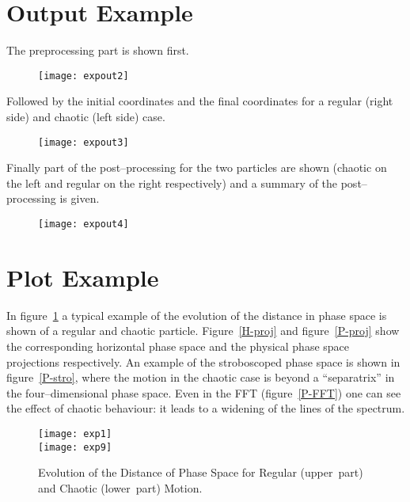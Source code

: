 \documentclass[a4paper,11pt]{report}
\begin{document}
\clearpage

\section{Output Example} \label{output}

The preprocessing part is shown first.
\begin{figure}[H]\vspace{-5mm}
\begin{center}
  \mbox{\texttt{[image: expout2]}}
\end{center}
\end{figure}
Followed by the initial coordinates and the final coordinates for a
regular (right side) and chaotic (left side) case.
\begin{figure}[H]\vspace{-5mm}
\begin{center}
  \mbox{\texttt{[image: expout3]}}
\end{center}
\end{figure}

\clearpage

Finally part of the post--processing for the two particles are shown
(chaotic on the left and regular on the right respectively) and a
summary of the post--processing is given.
\begin{figure}[H]
\begin{center}
  \mbox{\texttt{[image: expout4]}}
\end{center}
\end{figure}

\clearpage

\section{Plot Example} \label{plots}

{\small In figure~\ref{Lya} a typical example of the evolution of the
  distance in phase space is shown of a regular and chaotic particle.
  Figure~\ref{H-proj} and figure~\ref{P-proj} show the corresponding
  horizontal phase space and the physical phase space projections
  respectively. An example of the stroboscoped phase space is shown in
  figure~\ref{P-stro}, where the motion in the chaotic case is beyond
  a ``separatrix'' in the four--dimensional phase space. Even in the
  FFT (figure~\ref{P-FFT}) one can see the effect of chaotic
  behaviour: it leads to a widening of the lines of the spectrum.}
\begin{figure}[H] \vspace*{-5mm}
\begin{center}
  \mbox{\texttt{[image: exp1]}}
  \\[5mm]
  \mbox{\texttt{[image: exp9]}}
 \caption{\small Evolution of the Distance of Phase Space for Regular
   \mbox{(upper part)} and Chaotic \mbox{(lower part)} Motion.}
 \label{Lya}
\end{center}
\end{figure} 
\end{document}

